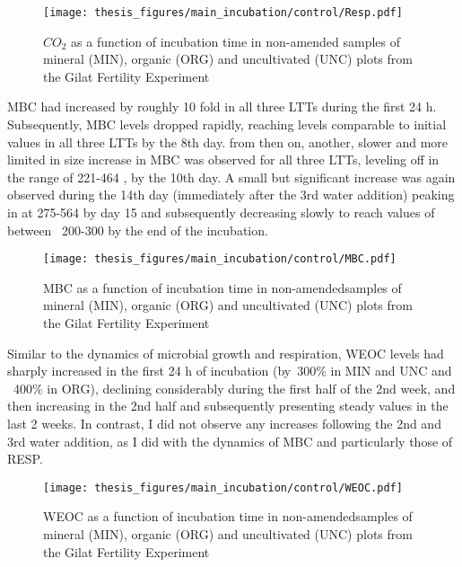 \documentclass[12pt]{report}
\begin{document}
		\begin{figure}[H]
			\centering
			\texttt{[image: thesis\_figures/main\_incubation/control/Resp.pdf]}
			\caption{$CO_2$  as a function of incubation time in non-amended samples of mineral (MIN), organic (ORG) and uncultivated (UNC) plots from the Gilat Fertility Experiment}
			\label{fig:resp_control_main}
		\end{figure}
		\noindent MBC had increased by roughly 10 fold in all three LTTs during the first 24 h. Subsequently, MBC levels dropped rapidly, reaching levels comparable to initial values in all three LTTs by the 8th day. from then on, another, slower and more limited in size increase in MBC was observed for all three LTTs, leveling off in the range of 221-464 \genericunit, by the 10th day. A small but significant increase was again observed during the 14th day (immediately after the 3rd water addition) peaking in at 275-564 \genericunit by day 15 and subsequently decreasing slowly to reach values of between ~200-300 \genericunit by the end of the incubation.\\
		\begin{figure}[H]
			\centering
			\texttt{[image: thesis\_figures/main\_incubation/control/MBC.pdf]}
			\caption{MBC  as a function of incubation time in non-amendedsamples of mineral (MIN), organic (ORG) and uncultivated (UNC) plots from the Gilat Fertility Experiment}
			\label{fig:mbc_control_main}
		\end{figure}
		\vspace{1cm}
		\noindent Similar to the dynamics of microbial growth and respiration, WEOC  levels had  sharply increased in the first 24 h of incubation (by~300$\%$ in MIN and UNC and ~400$\%$ in ORG), declining considerably during the first half of the 2nd week, and then increasing in the 2nd half and subsequently presenting steady values in the last 2 weeks. In contrast, I did not observe any increases following the 2nd and 3rd water addition, as I did with the dynamics of MBC and particularly those of RESP.  \\
		
		
		\begin{figure}[H]
			\centering
			\texttt{[image: thesis\_figures/main\_incubation/control/WEOC.pdf]}
			\caption{WEOC  as a function of incubation time in non-amendedsamples of mineral (MIN), organic (ORG) and uncultivated (UNC) plots from the Gilat Fertility Experiment}
			\label{fig:weoc_control_main}
		\end{figure}
		
\end{document}
